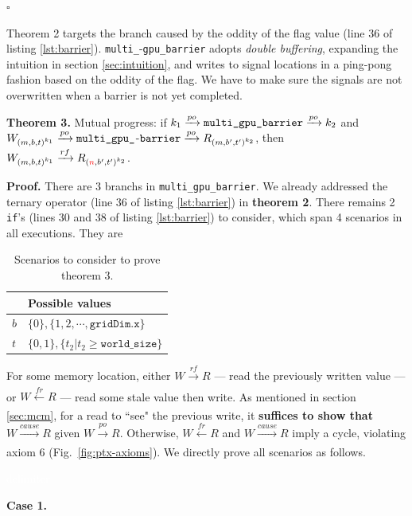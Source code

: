 \documentclass[acmsmall]{acmart}
\begin{document}
\begin{flushright}
$\square$
\end{flushright}

Theorem 2 targets the branch caused by the oddity of the flag value (line 36 of listing \ref{lst:barrier}). \verb|multi_|-\verb|gpu_barrier| adopts \textit{double buffering}, expanding the intuition in section \ref{sec:intuition}, and writes to signal locations in a ping-pong fashion based on the oddity of the flag. We have to make sure the signals are not overwritten when a barrier is not yet completed.

\noindent\textbf{Theorem 3.} Mutual progress: if $k_1 \xrightarrow[]{po} \verb|multi_gpu_barrier| \xrightarrow[]{po} k_2$ and $W_{{(m,b,t)}^{k_1}} \xrightarrow[]{po} \verb|multi_gpu_|$-$\verb|barrier| \xrightarrow[]{po} R_{{(m,b',t')}^{k_2}}$, then $W_{{(m,b,t)}^{k_1}} \xrightarrow[]{rf} R_{{(\textcolor{red}{n},b',t')}^{k_2}}$.

\noindent\textbf{Proof.} There are 3 branchs in \verb|multi_gpu_barrier|. We already addressed the ternary operator (line 36 of listing \ref{lst:barrier}) in \textbf{theorem 2}. There remains 2 \verb|if|'s (lines 30 and 38 of listing \ref{lst:barrier}) to consider, which span 4 scenarios in all executions. They are

\begin{table}[H]
\centering
\begin{tabular}{l|l}
 & Possible values \\\hline
$b$ & $\{0\}, \{1, 2, \cdots, \texttt{gridDim.x}\}$\\
$t$ & $\{0,1\}, \{t_2 | t_2 \geq \texttt{world\_size}\}$
\end{tabular}
\caption{Scenarios to consider to prove theorem 3.}
\label{table:scenarios}
\end{table}

For some memory location, either $W \xrightarrow[]{rf} R$ --- read the previously written value --- or $W \xleftarrow[]{fr} R$ --- read some stale value then write. As mentioned in section \ref{sec:mcm}, for a read to ``see" the previous write, it \textbf{suffices to show that $W \xrightarrow[]{cause} R$} given $W \xrightarrow[]{po} R$. Otherwise, $W \xleftarrow[]{fr} R$ and $W \xrightarrow[]{cause} R$ imply a cycle, violating axiom 6 (Fig.~\ref{fig:ptx-axioms}). We directly prove all scenarios as follows.

\textcolor{white}{delimiter}

\noindent\textbf{Case 1.}
\end{document}
